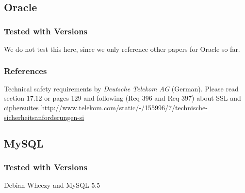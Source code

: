 
\subsection{Oracle}
\subsubsection{Tested with Versions}
\begin{itemize*}
\item We do not test this here, since we only reference other papers for Oracle so far.
\end{itemize*}


\subsubsection{References}
\begin{itemize*}
  \item Technical safety requirements by \emph{Deutsche Telekom AG} (German). Please read section 17.12 or pages 129 and following (Req 396 and Req 397) about SSL and ciphersuites \url{http://www.telekom.com/static/-/155996/7/technische-sicherheitsanforderungen-si}
\end{itemize*}






\subsection{MySQL}


\subsubsection{Tested with Versions}
\begin{itemize*}
  \item Debian Wheezy and MySQL 5.5
\end{itemize*}


